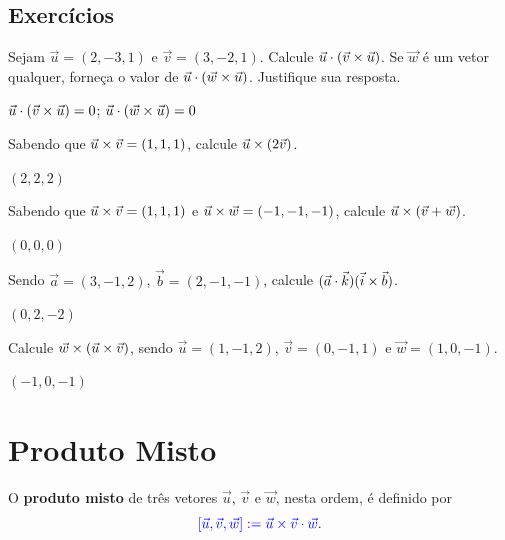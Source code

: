 \subsection{Exercícios}

\begin{exer}
  Sejam $\vec{u}=(2,-3,1)$ e $\vec{v}=(3,-2,1)$. Calcule $\vec{u}\cdot(\vec{v}\times\vec{u})$. Se $\vec{w}$ é um vetor qualquer, forneça o valor de $\vec{u}\cdot(\vec{w}\times\vec{u})$. Justifique sua resposta.
\end{exer}
\begin{resp}
  $\vec{u}\cdot(\vec{v}\times\vec{u})=0$; $\vec{u}\cdot(\vec{w}\times\vec{u})=0$
\end{resp}

\begin{exer}
  Sabendo que $\vec{u}\times\vec{v}=(1,1,1)$, calcule $\vec{u}\times(2\vec{v})$.
\end{exer}
\begin{resp}
  $(2,2,2)$
\end{resp}

\begin{exer}
  Sabendo que $\vec{u}\times\vec{v}=(1,1,1)$ e $\vec{u}\times\vec{w}=(-1,-1,-1)$, calcule $\vec{u}\times(\vec{v} + \vec{w})$.
\end{exer}
\begin{resp}
  $(0,0,0)$
\end{resp}

\begin{exer}
  Sendo $\vec{a}=(3,-1,2)$, $\vec{b}=(2,-1,-1)$, calcule $(\vec{a}\cdot\vec{k})(\vec{i}\times\vec{b})$.
\end{exer}
\begin{resp}
  $(0,2,-2)$
\end{resp}

\begin{exer}
  Calcule $\vec{w}\times(\vec{u}\times\vec{v})$, sendo $\vec{u}=(1,-1,2)$, $\vec{v}=(0,-1,1)$ e $\vec{w}=(1,0,-1)$.
\end{exer}
\begin{resp}
  $(-1,0,-1)$
\end{resp}

\section{Produto Misto}\label{cap_prodmisto_sec_defn}
\badgeRevisar

O {\bf produto misto} de três vetores $\vec{u}$, $\vec{v}$ e $\vec{w}$, nesta ordem, é definido por
\begin{equation}
  {\color{blue}[\vec{u},\vec{v},\vec{w}] := \vec{u}\times\vec{v}\cdot\vec{w}}.
\end{equation}


